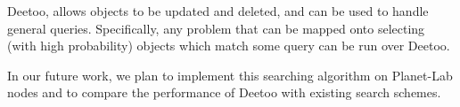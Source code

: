\documentclass[conference]{IEEEtran}
\begin{document}
Deetoo, allows objects to be updated and deleted, and can
be used to handle general queries.  Specifically, any problem
that can be mapped onto selecting (with high probability) objects
which match some query can be run over Deetoo.

In our future work, we plan to implement this searching algorithm
on Planet-Lab nodes and to compare the performance of Deetoo with
existing search schemes. 



\end{document}
